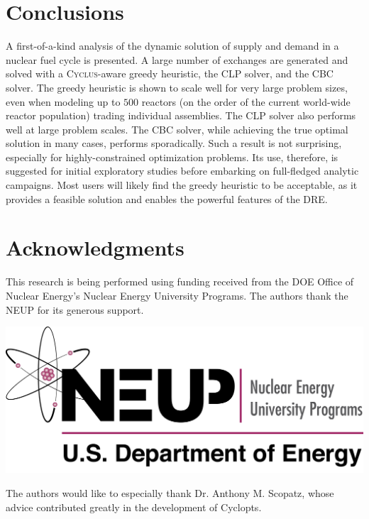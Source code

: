 \documentclass{anstrans}
\newcommand{\Cyclus}{\textsc{Cyclus}}
\begin{document}
\section{Conclusions}

A first-of-a-kind analysis of the dynamic solution of supply and demand in a
nuclear fuel cycle is presented. A large number of exchanges are generated and
solved with a \Cyclus-aware greedy heuristic, the CLP solver, and the CBC
solver. The greedy heuristic is shown to scale well for very large problem
sizes, even when modeling up to $500$ reactors (on the order of the current
world-wide reactor population) trading individual assemblies. The CLP solver
also performs well at large problem scales. The CBC solver, while achieving the
true optimal solution in many cases, performs sporadically. Such a result is not
surprising, especially for highly-constrained optimization problems. Its use,
therefore, is suggested for initial exploratory studies before embarking on
full-fledged analytic campaigns. Most users will likely find the greedy
heuristic to be acceptable, as it provides a feasible solution and enables the
powerful features of the DRE.


\section{Acknowledgments}

This research is being performed using funding received from the DOE
Office of Nuclear Energy's Nuclear Energy University Programs.  The
authors thank the NEUP for its generous support.

\begin{center}
\includegraphics[width=.25\columnwidth]{neup_logo_large.jpg}
\end{center}

The authors would like to especially thank Dr. Anthony M. Scopatz, whose advice
contributed greatly in the development of Cyclopts.



\end{document}
